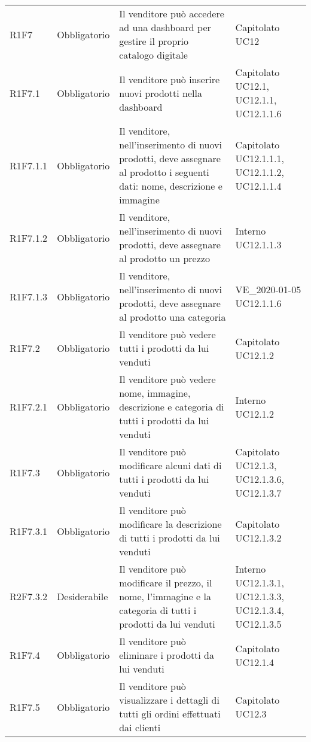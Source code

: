 {\begin{longtable}{C{2.5cm} C{2.8cm} C{6.7cm} C{2.5cm}}
R1F7 & Obbligatorio & Il venditore può accedere ad una dashboard per gestire il proprio catalogo digitale & Capitolato \newline UC12\\
R1F7.1 & Obbligatorio & Il venditore può inserire nuovi prodotti nella dashboard & Capitolato \newline UC12.1, UC12.1.1, UC12.1.1.6\\
R1F7.1.1 & Obbligatorio & Il venditore, nell'inserimento di nuovi prodotti, deve assegnare al prodotto i seguenti dati: nome, descrizione e immagine & Capitolato \newline UC12.1.1.1, UC12.1.1.2, UC12.1.1.4\\
R1F7.1.2 & Obbligatorio & Il venditore, nell'inserimento di nuovi prodotti, deve assegnare al prodotto un prezzo & Interno \newline UC12.1.1.3\\ 
R1F7.1.3 & Obbligatorio & Il venditore, nell'inserimento di nuovi prodotti, deve assegnare al prodotto una categoria & VE\_2020-01-05 \newline UC12.1.1.6\\ 
R1F7.2 & Obbligatorio & Il venditore può vedere tutti i prodotti da lui venduti & Capitolato \newline UC12.1.2 \\
R1F7.2.1 & Obbligatorio & Il venditore può vedere nome, immagine, descrizione e categoria di tutti i prodotti da lui venduti & Interno \newline UC12.1.2\\
R1F7.3 & Obbligatorio & Il venditore può modificare alcuni dati di tutti i prodotti da lui venduti & Capitolato \newline UC12.1.3, UC12.1.3.6, UC12.1.3.7 \\
R1F7.3.1 & Obbligatorio & Il venditore può modificare la descrizione di tutti i prodotti da lui venduti & Capitolato \newline UC12.1.3.2\\
R2F7.3.2 & Desiderabile & Il venditore può modificare il prezzo, il nome, l'immagine e la categoria di tutti i prodotti da lui venduti & Interno \newline UC12.1.3.1, UC12.1.3.3, UC12.1.3.4, UC12.1.3.5\\
R1F7.4 & Obbligatorio & Il venditore può eliminare i prodotti da lui venduti & Capitolato \newline UC12.1.4 \\
R1F7.5 & Obbligatorio & Il venditore può visualizzare i dettagli di tutti gli ordini effettuati dai clienti & Capitolato \newline UC12.3\\

\end{longtable}}
